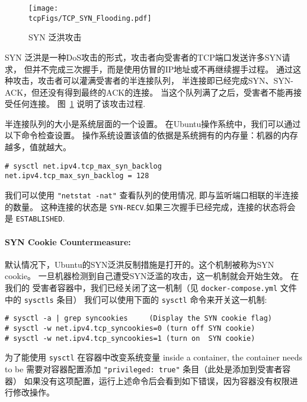 \begin{figure}[htb]
  \begin{center}
    \texttt{[image: \\tcpFigs/TCP\_SYN\_Flooding.pdf]}
  \end{center}
  \caption{SYN 泛洪攻击}
  \label{tcp:fig:synflooding}
\end{figure}
 


SYN 泛洪是一种DoS攻击的形式，攻击者向受害者的TCP端口发送许多SYN请求，
但并不完成三次握手，而是使用仿冒的IP地址或不再继续握手过程。
通过这种攻击，攻击者可以灌满受害者的半连接队列，
半连接即已经完成SYN、SYN-ACK，但还没有得到最终的ACK的连接。
当这个队列满了之后，受害者不能再接受任何连接。 
图~\ref{tcp:fig:synflooding} 说明了该攻击过程.

半连接队列的大小是系统层面的一个设置。 
在Ubuntu操作系统中，我们可以通过以下命令检查设置。
操作系统设置该值的依据是系统拥有的内存量：机器的内存越多，值就越大。


\begin{lstlisting}
# sysctl net.ipv4.tcp_max_syn_backlog
net.ipv4.tcp_max_syn_backlog = 128
\end{lstlisting}

我们可以使用 \texttt{"netstat -nat"} 查看队列的使用情况, 即与监听端口相联的半连接的数量。
这种连接的状态是 \texttt {SYN-RECV}.如果三次握手已经完成，连接的状态将会是 {\tt ESTABLISHED}. 

\paragraph{SYN Cookie Countermeasure:}
默认情况下，Ubuntu的SYN泛洪反制措施是打开的。这个机制被称为SYN cookie。
一旦机器检测到自己遭受SYN泛滥的攻击，这一机制就会开始生效。
在我们的 受害者容器中，我们已经关闭了这一机制（见  \texttt{docker-compose.yml} 文件中的 \texttt{sysctls} 条目）
我们可以使用下面的 \texttt{sysctl} 命令来开关这一机制:

\begin{lstlisting}
# sysctl -a | grep syncookies     (Display the SYN cookie flag) 
# sysctl -w net.ipv4.tcp_syncookies=0 (turn off SYN cookie)
# sysctl -w net.ipv4.tcp_syncookies=1 (turn on  SYN cookie)
\end{lstlisting}

为了能使用 \texttt{sysctl} 在容器中改变系统变量
inside a container, the container needs to be 
需要对容器配置添加 \texttt{"privileged: true"} 条目（此处是添加到受害者容器） 
如果没有这项配置，运行上述命令后会看到如下错误，因为容器没有权限进行修改操作。

